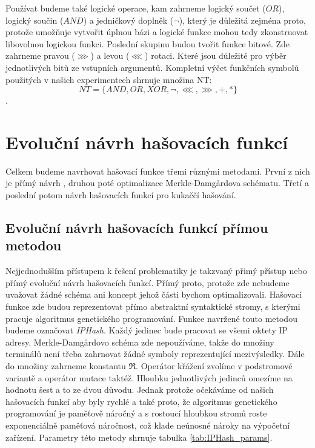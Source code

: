 Používat budeme také logické operace,
kam zahrneme logický součet ($OR$), logický součin ($AND$) a jedničkový doplněk ($\neg$), který 
je důležitá zejména proto, protože umožňuje vytvořit úplnou bázi a logické funkce mohou
tedy zkonstruovat libovolnou logickou funkci. Poslední skupinu budou tvořit funkce bitové.
Zde zahrneme pravou ($\ggg$) a levou ($\lll$) rotaci. Které jsou důležité pro výběr 
jednotlivých bitů ze vstupních argumentů. Kompletní výčet funkčních symbolů použitých v našich 
experimentech shrnuje množina NT:
$$NT=\{AND, OR, XOR, \neg, \lll, \ggg, +, *\}$$.


\section{Evoluční návrh hašovacích funkcí}

Celkem budeme navrhovat hašovací funkce třemi různými metodami. První z nich je přímý návrh
, druhou poté optimalizace Merkle-Damg\r{a}rdova schématu. Třetí a poslední potom návrh hašovacích
funkcí pro kukaččí hašování. 

\subsection{Evoluční návrh hašovacích funkcí přímou metodou}

Nejjednodušším přístupem k řešení problematiky je takzvaný přimý přístup nebo přímý evoluční 
návrh hašovacích funkcí. Přímý proto, protože zde nebudeme uvažovat žádné schéma ani koncept
jehož části bychom optimalizovali. Hašovací funkce zde budou reprezentovat přímo abstraktní syntaktické
stromy, s kterými pracuje algoritmus genetického programování. Funkce navržené touto metodou 
budeme označovat \textit{IPHash}. Každý jedinec bude pracovat se všemi oktety IP adresy.
Merkle-Damg\r{a}rdovo schéma zde nepoužíváme, takže do množiny terminálů není třeba zahrnovat
žádné symboly reprezentující mezivýsledky. Dále do množiny zahrneme konstantu  $\Re$. Operátor
křážení zvolíme v podstromové variantě a operátor mutace taktéž. Hloubku jednotlivých jedinců omezíme
na hodnotu šest a to ze dvou důvodu. Jednak protože očekáváme od našich hašovacích funkcí aby byly
rychlé a také proto, že algoritmus genetického programování je paměťově náročný a s rostoucí hloubkou
stromů roste exponenciálně paměťová náročnost, což klade neúnosné nároky na výpočetní zařízení.
Parametry této metody shrnuje tabulka \ref{tab:IPHash_params}.

